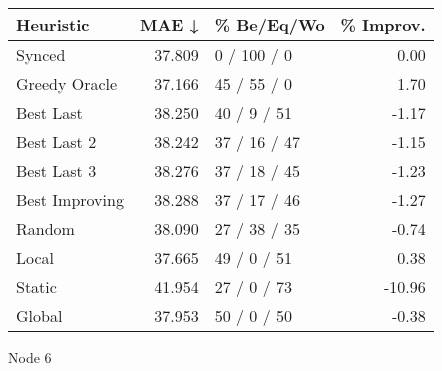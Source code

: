 \begin{tabular}{lrlr}
\toprule
\textbf{Heuristic} & \textbf{MAE ↓} & \textbf{\% Be/Eq/Wo} & \textbf{\% Improv.} \\
\midrule
            Synced &         37.809 &          0 / 100 / 0 &                0.00 \\
     Greedy Oracle &         37.166 &          45 / 55 / 0 &                1.70 \\
         Best Last &         38.250 &          40 / 9 / 51 &               -1.17 \\
       Best Last 2 &         38.242 &         37 / 16 / 47 &               -1.15 \\
       Best Last 3 &         38.276 &         37 / 18 / 45 &               -1.23 \\
    Best Improving &         38.288 &         37 / 17 / 46 &               -1.27 \\
            Random &         38.090 &         27 / 38 / 35 &               -0.74 \\
             Local &         37.665 &          49 / 0 / 51 &                0.38 \\
            Static &         41.954 &          27 / 0 / 73 &              -10.96 \\
            Global &         37.953 &          50 / 0 / 50 &               -0.38 \\
\bottomrule
\end{tabular}
\caption{Node 6}
\label{tab:non_lr05_le1_bs2_6}
